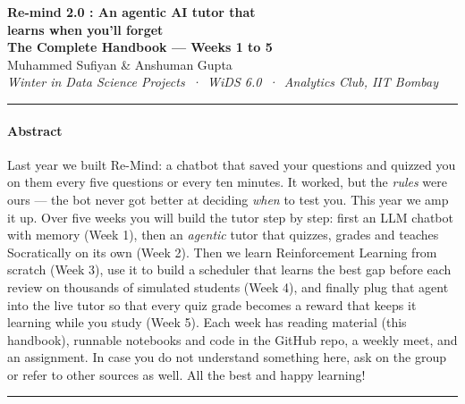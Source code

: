 



\begin{center}
{\LARGE\bfseries Re-mind 2.0 : An agentic AI tutor that\\[0.2em] learns when you'll forget}\\[0.6em]
{\Large\bfseries The Complete Handbook --- Weeks 1 to 5}\\[1.2em]
{\large Muhammed Sufiyan \quad \& \quad Anshuman Gupta}\\[0.3em]
\textit{Winter in Data Science Projects \,·\, WiDS 6.0 \,·\, Analytics Club, IIT Bombay}
\end{center}

\noindent\rule{\linewidth}{0.4pt}
\paragraph{Abstract}
Last year we built Re-Mind: a chatbot that saved your questions and quizzed you on them every five
questions or every ten minutes. It worked, but the \emph{rules} were ours --- the bot never got better at
deciding \emph{when} to test you. This year we amp it up. Over five weeks you will build the tutor step by step:
first an LLM chatbot with memory (Week 1), then an \emph{agentic} tutor that quizzes, grades and teaches
Socratically on its own (Week 2). Then we learn Reinforcement Learning from scratch (Week 3), use it to
build a scheduler that learns the best gap before each review on thousands of simulated students (Week 4),
and finally plug that agent into the live tutor so that every quiz grade becomes a reward that keeps it learning
while you study (Week 5). Each week has reading material (this handbook), runnable notebooks and code in
the GitHub repo, a weekly meet, and an assignment. In case you do not understand something here, ask on the
group or refer to other sources as well. All the best and happy learning!
\par\noindent\rule{\linewidth}{0.4pt}

\tableofcontents
\clearpage


